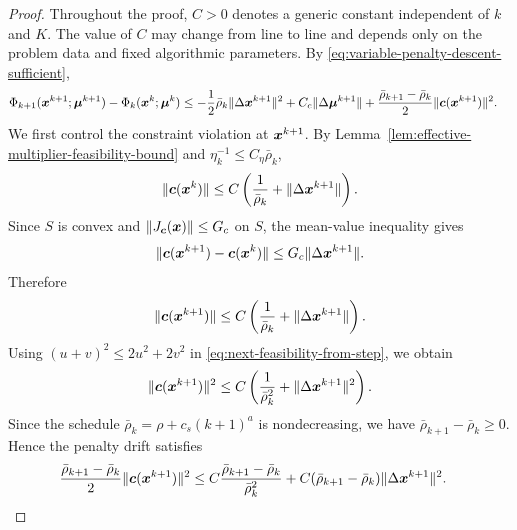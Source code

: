 \documentclass[10pt]{article}
\begin{document}
\begin{proof}
Throughout the proof, $C>0$ denotes a generic constant independent of $k$
and $K$.  The value of $C$ may change from line to line and depends only on
the problem data and fixed algorithmic parameters.
By \eqref{eq:variable-penalty-descent-sufficient},
\[
\begin{aligned}
    \Phi_{k+1}(\bm{x}^{k+1};\bm{\mu}^{k+1})-\Phi_k(\bm{x}^k;\bm{\mu}^k)
    &\le
    -\frac{1}{2}\bar\rho_k\|\Delta\bm{x}^{k+1}\|^2
    +C_c\|\Delta\bm{\mu}^{k+1}\| +
    \frac{\bar\rho_{k+1}-\bar\rho_k}{2}\|\bm{c}(\bm{x}^{k+1})\|^2 .
\end{aligned}
\]
We first control the constraint violation at $\bm{x}^{k+1}$.  By
Lemma~\ref{lem:effective-multiplier-feasibility-bound} and
$\eta_k^{-1}\le C_\eta\bar\rho_k$,
\[
    \|\bm{c}(\bm{x}^k)\|
    \le
    C\left(
    \frac{1}{\bar\rho_k}+\|\Delta\bm{x}^{k+1}\|
    \right).
\]
Since $S$ is convex and $\|J_{\bm{c}}(\bm{x})\|\le G_c$ on $S$, the mean-value
inequality gives
\[
    \|\bm{c}(\bm{x}^{k+1})-\bm{c}(\bm{x}^k)\|
    \le
    G_c\|\Delta\bm{x}^{k+1}\|.
\]
Therefore
\begin{equation}\label{eq:next-feasibility-from-step}
    \|\bm{c}(\bm{x}^{k+1})\|
    \le
    C\left(
    \frac{1}{\bar\rho_k}+\|\Delta\bm{x}^{k+1}\|
    \right).
\end{equation}
Using $(u+v)^2\le2u^2+2v^2$ in
\eqref{eq:next-feasibility-from-step}, we obtain
\[
    \|\bm{c}(\bm{x}^{k+1})\|^2
    \le
    C\left(
    \frac{1}{\bar\rho_k^2}+\|\Delta\bm{x}^{k+1}\|^2
    \right).
\]
Since the schedule $\bar\rho_k=\rho+c_s(k+1)^a$ is nondecreasing, we have
$\bar\rho_{k+1}-\bar\rho_k\ge0$.  Hence the penalty drift satisfies
\begin{equation}\label{eq:penalty-drift-decomposition}
\begin{aligned}
    \frac{\bar\rho_{k+1}-\bar\rho_k}{2}
    \|\bm{c}(\bm{x}^{k+1})\|^2
    &\le
    C\frac{\bar\rho_{k+1}-\bar\rho_k}{\bar\rho_k^2}
    +C(\bar\rho_{k+1}-\bar\rho_k)
    \|\Delta\bm{x}^{k+1}\|^2 .
\end{aligned}
\end{equation}


\end{proof}
\end{document}
